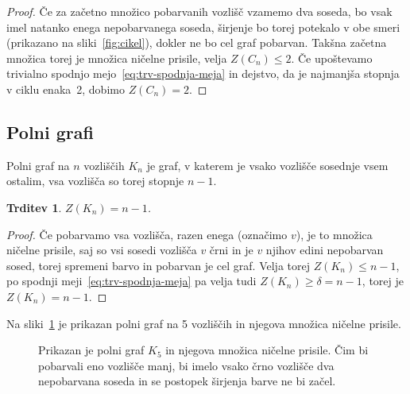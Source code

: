 \documentclass[12pt,a4paper,twoside]{article}
\theoremstyle{definition} %
\theoremstyle{plain} %
\newtheorem{trditev}[definicija]{Trditev}
\numberwithin{equation}{section}  %
\begin{document}
\begin{proof}
    Če za začetno množico pobarvanih vozlišč vzamemo dva soseda, bo vsak imel natanko enega nepobarvanega soseda, širjenje bo torej potekalo v obe smeri (prikazano na sliki~\ref{fig:cikel}), dokler ne bo cel graf pobarvan. Takšna začetna množica torej je množica ničelne prisile, velja $Z(C_n) \leq 2$. Če upoštevamo trivialno spodnjo mejo~\ref{eq:trv-spodnja-meja} in dejstvo, da je najmanjša stopnja v ciklu enaka~2, dobimo $Z(C_n) = 2$.\qedhere
\end{proof}

\subsection{Polni grafi}
Polni graf na $n$ vozliščih $K_n$ je graf, v katerem je vsako vozlišče sosednje vsem ostalim, vsa vozlišča so torej stopnje $n-1$. 
\begin{trditev}
    \label{trd:polni-graf}
    $Z(K_n) = n-1$.
\end{trditev}
\begin{proof}
    Če pobarvamo vsa vozlišča, razen enega (označimo $v$), je to množica ničelne prisile, saj so vsi sosedi vozlišča $v$ črni in je $v$ njihov edini nepobarvan sosed, torej spremeni barvo in pobarvan je cel graf. Velja torej $Z(K_n) \leq n-1$, po spodnji meji~\ref{eq:trv-spodnja-meja} pa velja tudi $Z(K_n) \geq \delta = n-1$, torej je $Z(K_n) = n-1$.
\end{proof}
Na sliki~\ref{fig:polni-graf} je prikazan polni graf na 5 vozliščih in njegova množica ničelne prisile.
\begin{figure}[h]
    \centering
    \caption{Prikazan je polni graf $K_5$ in njegova množica ničelne prisile. Čim bi pobarvali eno vozlišče manj, bi imelo vsako črno vozlišče dva nepobarvana soseda in se postopek širjenja barve ne bi začel.}
    \label{fig:polni-graf}
\end{figure}
\end{document}
